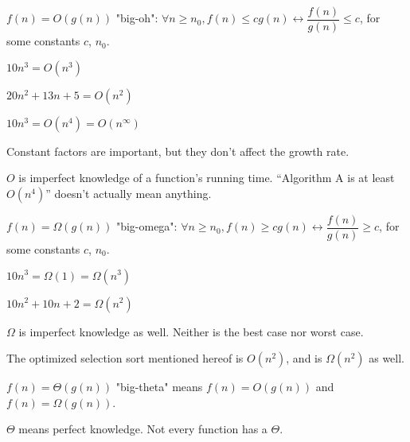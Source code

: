 \begin{defn}
$f(n) = O(g(n))$ "big-oh": $\forall n \geq n_0, f(n) \leq cg(n) \leftrightarrow \dfrac{f(n)}{g(n)} \leq c$, for some constants $c$, $n_0$.
\end{defn}

\begin{ex}
$10n^3 = O(n^3)$
\end{ex}

\begin{ex}
$20n^2 + 13n + 5 = O(n^2)$
\end{ex}

\begin{ex}
$10n^3 = O(n^4) = O(n^\infty)$
\end{ex}

Constant factors are important, but they don't affect the growth rate.

$O$ is imperfect knowledge of a function's running time. ``Algorithm A is at least $O(n^4)$'' doesn't actually mean anything.

\begin{defn}
$f(n) = \Omega (g(n))$ "big-omega": $\forall n \geq n_0, f(n) \geq cg(n) \leftrightarrow \dfrac{f(n)}{g(n)} \geq c$, for some constants $c$, $n_0$.
\end{defn}

\begin{ex}
$10n^3 = \Omega(1) = \Omega(n^3)$
\end{ex}

\begin{ex}
$10n^2 + 10n + 2 = \Omega(n^2)$
\end{ex}

$\Omega$ is imperfect knowledge as well. Neither is the best case nor worst case.

The optimized selection sort mentioned hereof is $O(n^2)$, and is $\Omega(n^2)$ as well.

\begin{defn}
$f(n) = \Theta(g(n))$ "big-theta" means $f(n) = O(g(n))$ and $f(n) = \Omega(g(n))$.
\end{defn}

$\Theta$ means perfect knowledge. Not every function has a $\Theta$.
